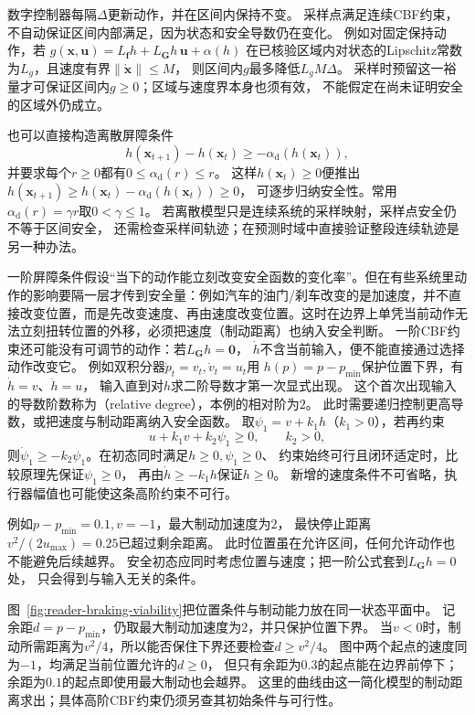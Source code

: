 数字控制器每隔$\Delta$更新动作，并在区间内保持不变。
采样点满足连续CBF约束，不自动保证区间内部满足，因为状态和安全导数仍在变化。
例如对固定保持动作，若
$g(\bm x,\bm u)=L_{\bm f}h+L_{\bm G}h\,\bm u+\alpha(h)$
在已核验区域内对状态的Lipschitz常数为$L_g$，且速度有界$\|\dot{\bm x}\|\leq M$，
则区间内$g$最多降低$L_gM\Delta$。
采样时预留这一裕量才可保证区间内$g\geq0$；区域与速度界本身也须有效，
不能假定在尚未证明安全的区域外仍成立。

也可以直接构造离散屏障条件
\[
  h(\bm x_{t+1})-h(\bm x_t)\geq-\alpha_{\mathrm d}(h(\bm x_t)),
\]
并要求每个$r\geq0$都有$0\leq\alpha_{\mathrm d}(r)\leq r$。
这样$h(\bm x_t)\geq0$便推出
$h(\bm x_{t+1})\geq h(\bm x_t)-\alpha_{\mathrm d}(h(\bm x_t))\geq0$，
可逐步归纳安全性。常用$\alpha_{\mathrm d}(r)=\gamma r$取$0<\gamma\leq1$。
若离散模型只是连续系统的采样映射，采样点安全仍不等于区间安全，
还需检查采样间轨迹；在预测时域中直接验证整段连续轨迹是另一种办法。

一阶屏障条件假设“当下的动作能立刻改变安全函数的变化率”。但在有些系统里动作的影响要隔一层才传到安全量：例如汽车的油门/刹车改变的是加速度，并不直接改变位置，而是先改变速度、再由速度改变位置。这时在边界上单凭当前动作无法立刻扭转位置的外移，必须把速度（制动距离）也纳入安全判断。
一阶CBF约束还可能没有可调节的动作：若$L_{\bm G}h=\bm0$，
$\dot h$不含当前输入，便不能直接通过选择动作改变它。
例如双积分器$\dot p_t=v_t,\dot v_t=u_t$用
$h(p)=p-p_{\min}$保护位置下界，有$\dot h=v$、$\ddot h=u$，
输入直到对$h$求二阶导数才第一次显式出现。
这个首次出现输入的导数阶数称为（relative degree），本例的相对阶为$2$。
此时需要递归控制更高导数，或把速度与制动距离纳入安全函数。
取$\psi_1=v+k_1h$（$k_1>0$），若再约束
\[
  u+k_1v+k_2\psi_1\geq0,\qquad k_2>0,
\]
则$\dot\psi_1\geq-k_2\psi_1$。在初态同时满足$h\geq0,\psi_1\geq0$、
约束始终可行且闭环适定时，比较原理先保证$\psi_1\geq0$，
再由$\dot h\geq-k_1h$保证$h\geq0$。
新增的速度条件不可省略，执行器幅值也可能使这条高阶约束不可行。

例如$p-p_{\min}=0.1,v=-1$，最大制动加速度为$2$，
最快停止距离$v^2/(2u_{\max})=0.25$已超过剩余距离。
此时位置虽在允许区间，任何允许动作也不能避免后续越界。
安全初态应同时考虑位置与速度；把一阶公式套到$L_{\bm G}h=0$处，
只会得到与输入无关的条件。

图~\ref{fig:reader-braking-viability}把位置条件与制动能力放在同一状态平面中。
记余距$d=p-p_{\min}$，仍取最大制动加速度为$2$，并只保护位置下界。
当$v<0$时，制动所需距离为$v^2/4$，所以能否保住下界还要检查$d\geq v^2/4$。
图中两个起点的速度同为$-1$，均满足当前位置允许的$d\geq0$，
但只有余距为$0.3$的起点能在边界前停下；余距为$0.1$的起点即使用最大制动也会越界。
这里的曲线由这一简化模型的制动距离求出；具体高阶CBF约束仍须另查其初始条件与可行性。

